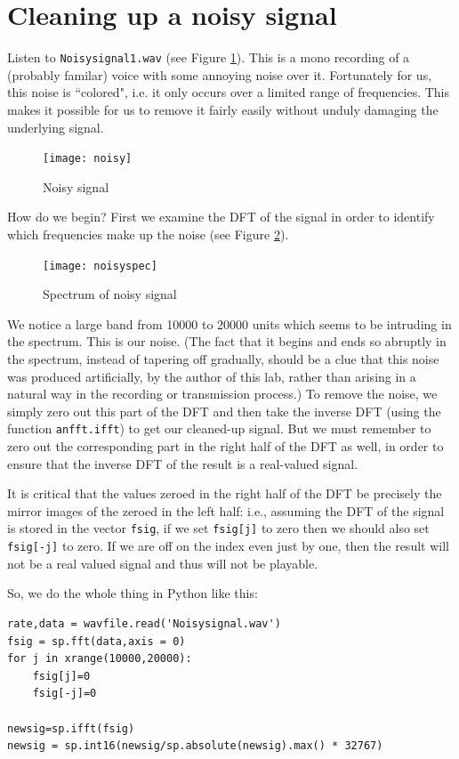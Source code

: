\section*{Cleaning up a noisy signal}

Listen to \texttt{Noisysignal1.wav} (see Figure \ref{noisysignal}). This is a mono recording of a (probably familar) voice with some annoying noise over it. Fortunately for us, this noise is ``colored", i.e. it only occurs over a limited range of frequencies. This makes it possible for us to remove it fairly easily without unduly damaging the underlying signal.
\begin{figure}[ht]\caption{Noisy signal}\label{noisysignal}\centering\texttt{[image: noisy]}\end{figure}
How do we begin? First we examine the DFT of the signal in order to identify which frequencies make up the noise (see Figure \ref{noisyspec}).
\begin{figure}[ht]\caption{Spectrum of noisy signal}\label{noisyspec}\centering\texttt{[image: noisyspec]}\end{figure}
We notice a large band from 10000 to 20000 units which seems to be intruding in the spectrum. This is our noise. (The fact that it begins and ends so abruptly in the spectrum, instead of tapering off gradually, should be a clue that this noise was produced artificially, by the author of this lab, rather than arising in a natural way in the recording or transmission process.) To remove the noise, we simply zero out this part of the DFT and then take the inverse DFT (using the function \texttt{anfft.ifft}) to get our cleaned-up signal. But we must remember to zero out the corresponding part in the right half of the DFT as well, in order to ensure that the inverse DFT of the result is a real-valued signal.

It is critical that the values zeroed in the right half of the DFT be precisely the mirror images of the zeroed in the left half: i.e., assuming the DFT of the signal is stored in the vector \texttt{fsig}, if we set \texttt{fsig[j]} to zero then we should also set \texttt{fsig[-j]} to zero. If we are off on the index even just by one, then the result will not be a real valued signal and thus will not be playable.

So, we do the whole thing in Python like this:
\begin{lstlisting}
rate,data = wavfile.read('Noisysignal.wav')
fsig = sp.fft(data,axis = 0)
for j in xrange(10000,20000):
    fsig[j]=0
    fsig[-j]=0

newsig=sp.ifft(fsig)
newsig = sp.int16(newsig/sp.absolute(newsig).max() * 32767)
\end{lstlisting}

